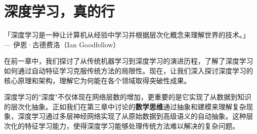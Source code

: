 \chapter{深度学习，真的行}

\begin{flushright}
「深度学习是一种让计算机从经验中学习并根据层次化概念来理解世界的技术。」 \\
--- 伊恩·古德费洛（Ian Goodfellow）
\end{flushright}

在前一章中，我们探讨了从传统机器学习到深度学习的演进历程，了解了深度学习如何通过自动特征学习克服传统方法的局限性。现在，让我们深入探讨深度学习的核心原理和架构，理解它为何能在各个领域取得突破性成果。

深度学习的"深度"不仅体现在网络层数的增加，更重要的是它实现了从数据到知识的层次化抽象。正如我们在第三章中讨论的{\bf 数学思维}通过抽象和建模来理解复杂现象，深度学习通过多层神经网络实现了从原始数据到高级语义的自动抽象。这种层次化的特征学习能力，使得深度学习能够处理传统方法难以解决的复杂问题。



%
%

